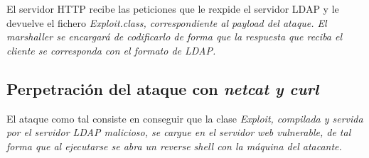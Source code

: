 \documentclass[../main.tex]{subfiles}
\begin{document}
El servidor HTTP recibe las peticiones que le rexpide el servidor LDAP y le devuelve el fichero \it{Exploit.class}, correspondiente al \it{payload} del ataque. El \it{marshaller} se encargará de codificarlo de forma que la respuesta que reciba el cliente se corresponda con el formato de LDAP.

\subsection{Perpetración del ataque con \it{netcat} y \it{curl}}

El ataque como tal consiste en conseguir que la clase \it{Exploit}, compilada y servida por el servidor LDAP malicioso, se cargue en el servidor web vulnerable, de tal forma que al ejecutarse se abra un \it{reverse shell} con la máquina del atacante.
\end{document}
